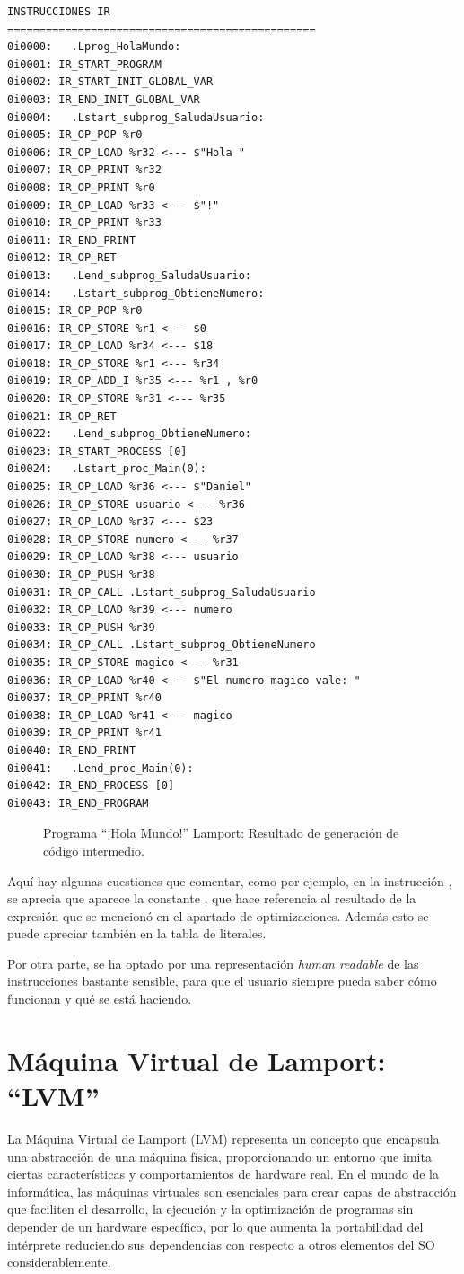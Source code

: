 \begin{verbatim}
INSTRUCCIONES IR
================================================
0i0000:   .Lprog_HolaMundo:
0i0001: IR_START_PROGRAM 
0i0002: IR_START_INIT_GLOBAL_VAR 
0i0003: IR_END_INIT_GLOBAL_VAR 
0i0004:   .Lstart_subprog_SaludaUsuario:
0i0005: IR_OP_POP %r0
0i0006: IR_OP_LOAD %r32 <--- $"Hola "
0i0007: IR_OP_PRINT %r32
0i0008: IR_OP_PRINT %r0
0i0009: IR_OP_LOAD %r33 <--- $"!"
0i0010: IR_OP_PRINT %r33
0i0011: IR_END_PRINT 
0i0012: IR_OP_RET 
0i0013:   .Lend_subprog_SaludaUsuario:
0i0014:   .Lstart_subprog_ObtieneNumero:
0i0015: IR_OP_POP %r0
0i0016: IR_OP_STORE %r1 <--- $0
0i0017: IR_OP_LOAD %r34 <--- $18
0i0018: IR_OP_STORE %r1 <--- %r34
0i0019: IR_OP_ADD_I %r35 <--- %r1 , %r0
0i0020: IR_OP_STORE %r31 <--- %r35
0i0021: IR_OP_RET 
0i0022:   .Lend_subprog_ObtieneNumero:
0i0023: IR_START_PROCESS [0]
0i0024:   .Lstart_proc_Main(0):
0i0025: IR_OP_LOAD %r36 <--- $"Daniel"
0i0026: IR_OP_STORE usuario <--- %r36
0i0027: IR_OP_LOAD %r37 <--- $23
0i0028: IR_OP_STORE numero <--- %r37
0i0029: IR_OP_LOAD %r38 <--- usuario
0i0030: IR_OP_PUSH %r38
0i0031: IR_OP_CALL .Lstart_subprog_SaludaUsuario
0i0032: IR_OP_LOAD %r39 <--- numero
0i0033: IR_OP_PUSH %r39
0i0034: IR_OP_CALL .Lstart_subprog_ObtieneNumero
0i0035: IR_OP_STORE magico <--- %r31
0i0036: IR_OP_LOAD %r40 <--- $"El numero magico vale: "
0i0037: IR_OP_PRINT %r40
0i0038: IR_OP_LOAD %r41 <--- magico
0i0039: IR_OP_PRINT %r41
0i0040: IR_END_PRINT 
0i0041:   .Lend_proc_Main(0):
0i0042: IR_END_PROCESS [0]
0i0043: IR_END_PROGRAM 
\end{verbatim}
\begin{figure}[hbtp]
\caption{Programa ``¡Hola Mundo!'' Lamport: Resultado de generación de código intermedio.}
\label{fig:IRHolaMundo}
\end{figure}

Aquí hay algunas cuestiones que comentar, como por ejemplo, en la instrucción , se aprecia que aparece la constante , que hace referencia al resultado de la expresión que se mencionó en el apartado de optimizaciones. Además esto se puede apreciar también en la tabla de literales. 


Por otra parte, se ha optado por una representación \textit{human readable} de las instrucciones bastante sensible, para que el usuario siempre pueda saber cómo funcionan y qué se está haciendo.

\section{Máquina Virtual de Lamport: ``LVM''}\label{sec:implementacionLVM}
La Máquina Virtual de Lamport (LVM) representa un concepto que encapsula una abstracción de una máquina física, proporcionando un entorno que imita ciertas características y comportamientos de hardware real. En el mundo de la informática, las máquinas virtuales son esenciales para crear capas de abstracción que faciliten el desarrollo, la ejecución y la optimización de programas sin depender de un hardware específico, por lo que aumenta la portabilidad del intérprete reduciendo sus dependencias con respecto a otros elementos del SO considerablemente.

